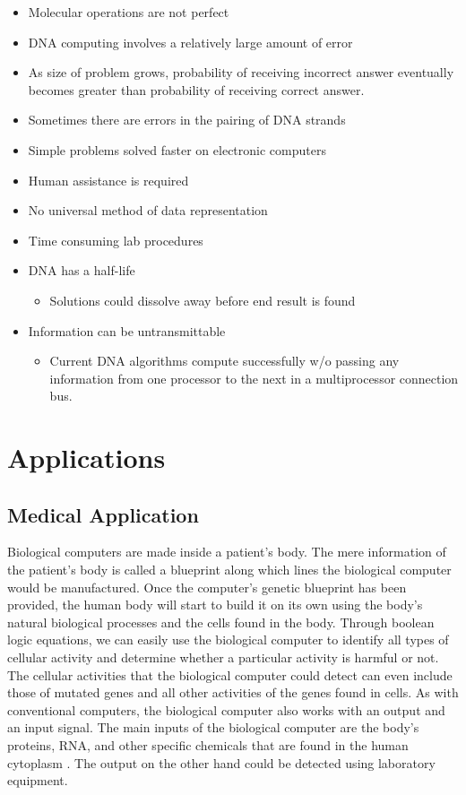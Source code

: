 \documentclass[a4paper]{article}
\begin{document}
    \begin{itemize}
    \item {Molecular operations are not perfect}
    \item {DNA computing involves a relatively large amount of error}
    \item {As size of problem grows, probability of receiving incorrect answer eventually becomes greater than probability of receiving correct answer.}
    \item {Sometimes there are errors in the pairing of DNA strands}
        \item {Simple problems solved faster on electronic computers}
    \item {Human assistance is required}
    \item {No universal method of data representation}
    \item {Time consuming lab procedures}
        \item {DNA has a half-life
          \begin{itemize}
        \item{Solutions could dissolve away before end result is found}
      \end{itemize}
            }
        \item {Information can be untransmittable
          \begin{itemize}
        \item{Current DNA algorithms compute successfully w/o passing any information from one processor to the next in a multiprocessor connection bus.}
      \end{itemize}
            }
  \end{itemize}

\section{Applications}

\subsection{Medical Application}

Biological computers are made inside a patient’s body. The mere information of the patient’s body is called a blueprint along which lines the biological computer would be manufactured. Once the computer’s genetic blueprint has been provided, the human body will start to build it on its own using the body’s natural biological processes  and the cells found in the body. Through boolean logic equations, we can easily use the biological computer to identify all types of cellular  activity and determine whether a particular activity is harmful or not. The cellular activities that the biological computer could detect can even include those of mutated genes and all other activities of the genes found in cells. As with conventional computers, the biological computer also works with an output and an input signal. The main inputs of the biological computer are the body’s proteins, RNA, and other specific chemicals that are found in the human cytoplasm . The output on the other hand could be detected using laboratory equipment.
\end{document}
